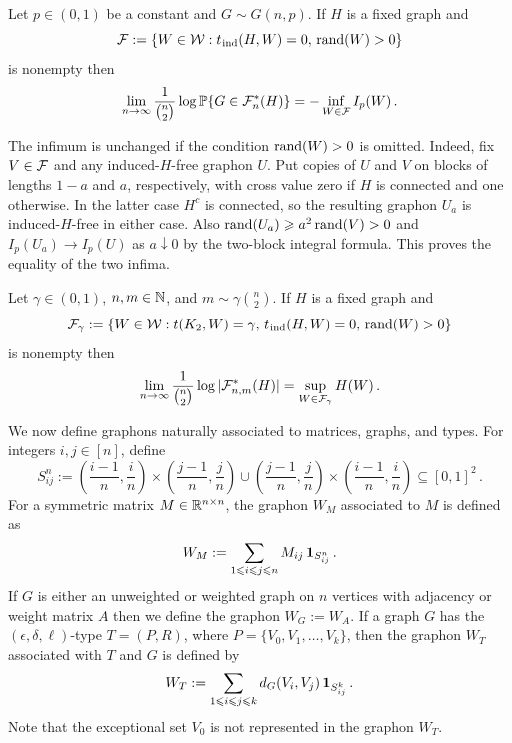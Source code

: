 \begin{lemma}\label{lemma:LDPforGNPkl}
Let $p\in(0,1)$ be a constant and $G\sim G(n,p)$. If $H$ is a fixed graph and
$${\mathcal F}:=\{W\in{\mathcal W}:t_{{\hspace{0.2mm}\mathrm{ind}}}(H,W)=0,\,\operatorname{rand}(W)>0\}$$
is nonempty then
$$\lim_{n\to\infty}\frac{1}{\binom{n}{2}}\log{\mathbb P}\{G\in{\mathcal F}^\ast_n(H)\}=-\inf_{W\in{\mathcal F}}I_p(W)\,.$$
\end{lemma}
The infimum is unchanged if the condition $\operatorname{rand}(W)>0$ is omitted. Indeed, fix $V\in{\mathcal F}$ and any induced-$H$-free graphon $U$. Put copies of $U$ and $V$ on blocks of lengths $1-a$ and $a$, respectively, with cross value zero if $H$ is connected and one otherwise. In the latter case $H^c$ is connected, so the resulting graphon $U_a$ is induced-$H$-free in either case. Also $\operatorname{rand}(U_a)\geqslant a^2\operatorname{rand}(V)>0$ and $I_p(U_a)\to I_p(U)$ as $a\downarrow0$ by the two-block integral formula. This proves the equality of the two infima.

\begin{lemma}\label{lemma:FnmGraphonOptAsymps}
Let $\gamma\in(0,1)$, $n,m\in{\mathbb N}$, and $m\sim\gamma\binom{n}{2}$. If $H$ is a fixed graph and
$${\mathcal F}_\gamma:=\{W\in{\mathcal W}:t(K_2,W)=\gamma,\,t_{{\hspace{0.2mm}\mathrm{ind}}}(H,W)=0,\,\operatorname{rand}(W)>0\}$$
is nonempty then
$$\lim_{n\to\infty}\frac{1}{\binom{n}{2}}\log|{\mathcal F}^\ast_{n,m}(H)|=\sup_{W\in{\mathcal F}_\gamma}H(W)\,.$$
\end{lemma}

We now define graphons naturally associated to matrices, graphs, and types. For integers $i,j\in[n]$, define
\begin{equation}\label{dfn:snij}
S^n_{ij}:=\left(\frac{i-1}{n},\frac{i}{n}\right)\times\left(\frac{j-1}{n},\frac{j}{n}\right)\cup\left(\frac{j-1}{n},\frac{j}{n}\right)\times\left(\frac{i-1}{n},\frac{i}{n}\right)\subseteq[0,1]^2\,.
\end{equation}
For a symmetric matrix $M\in{\mathbb R}^{n\times n}$, the graphon $W_M$ associated to $M$ is defined as
$$W_M:=\sum_{1\leqslant i\leqslant j\leqslant n}M_{ij}\,\boldsymbol{1}_{S_{ij}^n}\,.$$
If $G$ is either an unweighted or weighted graph on $n$ vertices with adjacency or weight matrix $A$ then we define the graphon $W_G:=W_A$.
If a graph $G$ has the $(\epsilon,\delta,\ell)$-type $T=(P,R)$, where $P=\{V_0,V_1,\dots,V_k\}$, then the graphon $W_T$ associated with $T$ and $G$ is defined by
$$W_T:=\sum_{1\leqslant i\leqslant j\leqslant k}d_G(V_i,V_j)\,\boldsymbol{1}_{S_{ij}^k}\,.$$
Note that the exceptional set $V_0$ is not represented in the graphon $W_T$.

